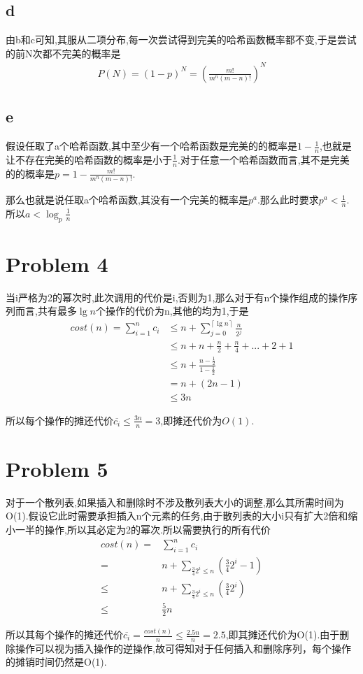 \documentclass[12pt,a4paper,fontset=none]{ctexart}
\begin{document}
\subsection{d}
由b和c可知,其服从二项分布,每一次尝试得到完美的哈希函数概率都不变,于是尝试的前N次都不完美的概率是
\begin{align*}
    P(N)=(1-p)^N=(\frac{m!}{m^n (m-n)!})^N
\end{align*}
\subsection{e}
假设任取了a个哈希函数,其中至少有一个哈希函数是完美的的概率是$1-\frac{1}{n} $,也就是让不存在完美的哈希函数的概率是小于$\frac{1}{n} $.对于任意一个哈希函数而言,其不是完美的的概率是$p=1-\frac{m!}{m^n (m-n)!}$.

那么也就是说任取a个哈希函数,其没有一个完美的概率是$p^a$.那么此时要求$p^a<\frac{1}{n} $.所以$a<\log_p\frac{1}{n} $
\section{Problem 4}
当i严格为2的幂次时,此次调用的代价是i,否则为1,那么对于有n个操作组成的操作序列而言,共有最多$\lg n$个操作的代价为n,其他的均为1,于是
\begin{align*}
    cost(n)=\sum_{i=1}^{n}c_i & \leq n+\sum_{j=0}^{\left\lceil \lg n\right\rceil }\frac{n}{2^j} \\
                              & \leq n+n+\frac{n}{2} +\frac{n}{4} +...+2+1                      \\
                              & \leq n+\frac{n-\frac{1}{2} }{1-\frac{1}{2} }                    \\
                              & =n+(2n-1)                                                       \\
                              & \leq 3n
\end{align*}

所以每个操作的摊还代价$\overline{c_i}\leq \frac{3n}{n} =3$,即摊还代价为$O(1)$.
\section{Problem 5}
对于一个散列表,如果插入和删除时不涉及散列表大小的调整,那么其所需时间为O(1).假设它此时需要承担插入n个元素的任务,由于散列表的大小i只有扩大2倍和缩小一半的操作,所以其必定为2的幂次.所以需要执行的所有代价
\begin{align*}
    cost(n)= & \sum_{i=1}^{n}c_i                                 \\
    =        & n+\sum_{\frac{3}{4} 2^i\leq n}(\frac{3}{4} 2^i-1) \\
    \leq     & n+\sum_{\frac{3}{4} 2^i\leq n}(\frac{3}{4} 2^i)   \\
    \leq     & \frac{5}{2} n
\end{align*}

所以其每个操作的摊还代价$\overline{c_i}=\frac{cost(n)}{n} \leq \frac{2.5n}{n} =2.5$,即其摊还代价为O(1).由于删除操作可以视为插入操作的逆操作,故可得知对于任何插入和删除序列，每个操作的摊销时间仍然是O(1).
\end{document}
